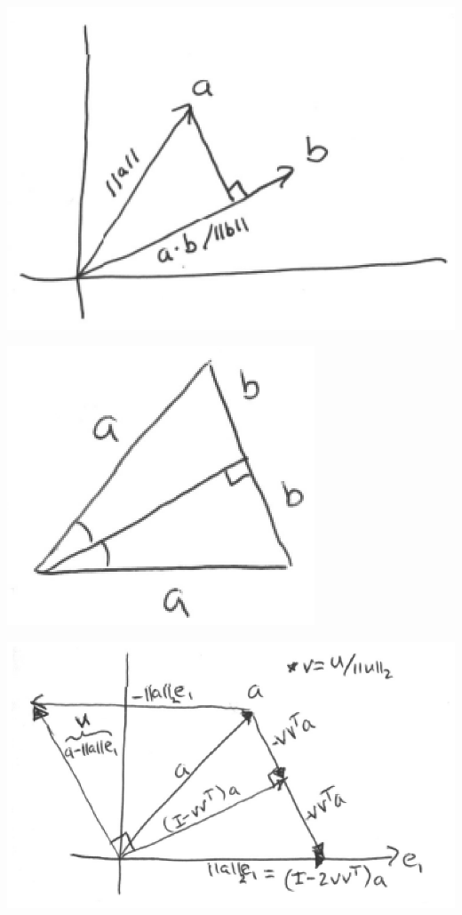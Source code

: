\includegraphics{projection.eps}

\includegraphics{isosoles_triangle.eps}

\includegraphics{householder.eps}


